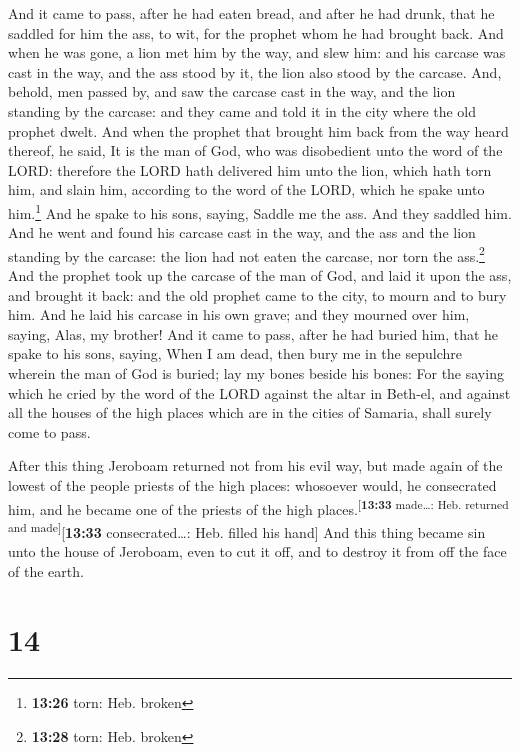  And it came to pass, after he had eaten bread, and after
he had drunk, that he saddled for him the ass, to wit, for the prophet
whom he had brought back.  And when he was gone, a lion
met him by the way, and slew him: and his carcase was cast in the way,
and the ass stood by it, the lion also stood by the carcase.
 And, behold, men passed by, and saw the carcase cast in
the way, and the lion standing by the carcase: and they came and told it
in the city where the old prophet dwelt.  And when the
prophet that brought him back from the way heard thereof, he said, It is
the man of God, who was disobedient unto the word of the LORD: therefore
the LORD hath delivered him unto the lion, which hath torn him, and
slain him, according to the word of the LORD, which he spake unto
him.\footnote{\textbf{13:26} torn: Heb. broken}  And he
spake to his sons, saying, Saddle me the ass. And they saddled him.
 And he went and found his carcase cast in the way, and
the ass and the lion standing by the carcase: the lion had not eaten the
carcase, nor torn the ass.\footnote{\textbf{13:28} torn: Heb. broken}
 And the prophet took up the carcase of the man of God,
and laid it upon the ass, and brought it back: and the old prophet came
to the city, to mourn and to bury him.  And he laid his
carcase in his own grave; and they mourned over him, saying, Alas, my
brother!  And it came to pass, after he had buried him,
that he spake to his sons, saying, When I am dead, then bury me in the
sepulchre wherein the man of God is buried; lay my bones beside his
bones:  For the saying which he cried by the word of the
LORD against the altar in Beth-el, and against all the houses of the
high places which are in the cities of Samaria, shall surely come to
pass.

 After this thing Jeroboam returned not from his evil
way, but made again of the lowest of the people priests of the high
places: whosoever would, he consecrated him, and he became one of the
priests of the high places.\textsuperscript{{[}\textbf{13:33}
made\ldots: Heb. returned and made{]}}{[}\textbf{13:33}
consecrated\ldots: Heb. filled his hand{]}  And this
thing became sin unto the house of Jeroboam, even to cut it off, and to
destroy it from off the face of the earth.

\hypertarget{section-13}{%
\section{14}\label{section-13}}

